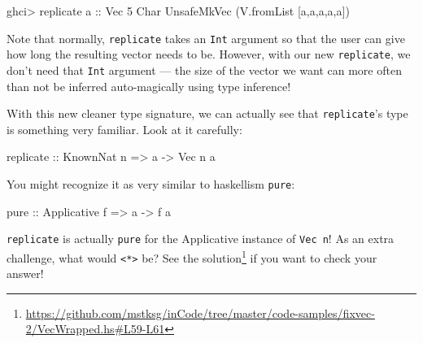 \documentclass[]{article}
\newenvironment{Shaded}{}{}
\newcommand{\CharTok}[1]{\textcolor[rgb]{0.25,0.44,0.63}{#1}}
\newcommand{\DataTypeTok}[1]{\textcolor[rgb]{0.56,0.13,0.00}{#1}}
\newcommand{\DecValTok}[1]{\textcolor[rgb]{0.25,0.63,0.44}{#1}}
\newcommand{\FunctionTok}[1]{\textcolor[rgb]{0.02,0.16,0.49}{#1}}
\newcommand{\NormalTok}[1]{#1}
\newcommand{\OperatorTok}[1]{\textcolor[rgb]{0.40,0.40,0.40}{#1}}
\newcommand{\OtherTok}[1]{\textcolor[rgb]{0.00,0.44,0.13}{#1}}
\renewcommand{\href}[2]{#2\footnote{\url{#1}}}
\begin{document}
\begin{Shaded}
\begin{Highlighting}[]
\NormalTok{ghci}\OperatorTok{>} \FunctionTok{replicate} \CharTok{\textquotesingle{}a\textquotesingle{}}\OtherTok{ ::} \DataTypeTok{Vec} \DecValTok{5} \DataTypeTok{Char}
\DataTypeTok{UnsafeMkVec}\NormalTok{ (V.fromList [}\CharTok{\textquotesingle{}a\textquotesingle{}}\NormalTok{,}\CharTok{\textquotesingle{}a\textquotesingle{}}\NormalTok{,}\CharTok{\textquotesingle{}a\textquotesingle{}}\NormalTok{,}\CharTok{\textquotesingle{}a\textquotesingle{}}\NormalTok{,}\CharTok{\textquotesingle{}a\textquotesingle{}}\NormalTok{])}
\end{Highlighting}
\end{Shaded}

Note that normally, \texttt{replicate} takes an \texttt{Int} argument so that
the user can give how long the resulting vector needs to be. However, with our
new \texttt{replicate}, we don't need that \texttt{Int} argument --- the size of
the vector we want can more often than not be inferred auto-magically using type
inference!

With this new cleaner type signature, we can actually see that
\texttt{replicate}'s type is something very familiar. Look at it carefully:

\begin{Shaded}
\begin{Highlighting}[]
\FunctionTok{replicate}\OtherTok{ ::} \DataTypeTok{KnownNat}\NormalTok{ n }\OtherTok{=>}\NormalTok{ a }\OtherTok{{-}>} \DataTypeTok{Vec}\NormalTok{ n a}
\end{Highlighting}
\end{Shaded}

You might recognize it as very similar to haskellism \texttt{pure}:

\begin{Shaded}
\begin{Highlighting}[]
\FunctionTok{pure}\OtherTok{ ::} \DataTypeTok{Applicative}\NormalTok{ f }\OtherTok{=>}\NormalTok{ a }\OtherTok{{-}>}\NormalTok{ f a}
\end{Highlighting}
\end{Shaded}

\texttt{replicate} is actually \texttt{pure} for the Applicative instance of
\texttt{Vec\ n}! As an extra challenge, what would
\texttt{\textless{}*\textgreater{}} be? See
\href{https://github.com/mstksg/inCode/tree/master/code-samples/fixvec-2/VecWrapped.hs\#L59-L61}{the
solution} if you want to check your answer!
\end{document}
